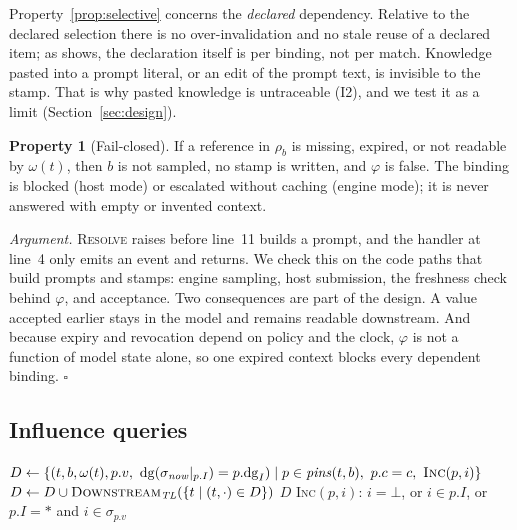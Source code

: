 \documentclass[10pt,conference]{IEEEtran}
\theoremstyle{definition}
\newtheorem{proposition}{Property}
\newcommand{\TL}{\mathit{TL}}
\newcommand{\dig}{\mathrm{dg}}
\begin{document}
Property~\ref{prop:selective} concerns the \emph{declared} dependency. Relative to the declared selection there
is no over-invalidation and no stale reuse of a declared item; as  shows, the declaration
itself is per binding, not per match. Knowledge pasted into a prompt literal, or an edit of the prompt text,
is invisible to the stamp. That is why pasted knowledge is untraceable (I2), and we test it as a limit
(Section~\ref{sec:design}).

\begin{proposition}[Fail-closed]\label{prop:failclosed}
If a reference in $\rho_b$ is missing, expired, or not readable by $\omega(t)$, then $b$ is not sampled, no
stamp is written, and $\varphi$ is false. The binding is blocked (host mode) or escalated without caching
(engine mode); it is never answered with empty or invented context.
\end{proposition}
\noindent\emph{Argument.} \textsc{Resolve} raises before line~11 builds a prompt, and the handler at line~4
only emits an event and returns. We check this on the code paths that build prompts and stamps: engine
sampling, host submission, the freshness check behind $\varphi$, and acceptance. Two consequences are part of
the design. A value accepted earlier stays in the model and remains readable downstream. And because expiry
and revocation depend on policy and the clock, $\varphi$ is not a function of model state alone, so one
expired context blocks every dependent binding. \hfill$\square$

\subsection{Influence queries}\label{sec:influence}

\begin{algorithm}[t]
\caption{Influence (exposure) of a context item over pinned trace links}
\label{alg:infl}
\small
\begin{algorithmic}[1]
 
  \State $D\gets\{(t,b,\omega(t),p.v,\ \dig(\sigma_{\mathit{now}}|_{p.I})=p.\dig_I)\mid
         p\in\mathit{pins}(t,b),\ p.c=c,\ \textsc{Inc}(p,i)\}$
   $D\gets D\cup\textsc{Downstream}_{\TL}(\{t\mid(t,\cdot)\in D\})$
  \EndIf
  \State \Return $D$
\EndFunction
\Statex \textsc{Inc}$(p,i)$: $i=\bot$, or $i\in p.I$, or $p.I=*$ and $i\in\sigma_{p.v}$
\end{algorithmic}
\end{algorithm}
\end{document}
